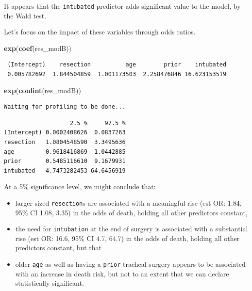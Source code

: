 \documentclass[]{book}
\newenvironment{Shaded}{\begin{snugshade}}{\end{snugshade}}
\newcommand{\KeywordTok}[1]{\textcolor[rgb]{0.13,0.29,0.53}{\textbf{#1}}}
\newcommand{\NormalTok}[1]{#1}
\providecommand{\tightlist}{%
  \setlength{\itemsep}{0pt}\setlength{\parskip}{0pt}}
\theoremstyle{definition}
\theoremstyle{definition}
\theoremstyle{definition}
\theoremstyle{remark}
\begin{document}
It appears that the \texttt{intubated} predictor adds significant value
to the model, by the Wald test.

Let's focus on the impact of these variables through odds ratios.

\begin{Shaded}
\begin{Highlighting}[]
\KeywordTok{exp}\NormalTok{(}\KeywordTok{coef}\NormalTok{(res_modB))}
\end{Highlighting}
\end{Shaded}

\begin{verbatim}
 (Intercept)    resection          age        prior    intubated 
 0.005782692  1.844504859  1.001173503  2.258476846 16.623153519 
\end{verbatim}

\begin{Shaded}
\begin{Highlighting}[]
\KeywordTok{exp}\NormalTok{(}\KeywordTok{confint}\NormalTok{(res_modB))}
\end{Highlighting}
\end{Shaded}

\begin{verbatim}
Waiting for profiling to be done...
\end{verbatim}

\begin{verbatim}
                   2.5 %     97.5 %
(Intercept) 0.0002408626  0.0837263
resection   1.0804548590  3.3495636
age         0.9618416869  1.0442885
prior       0.5485116610  9.1679931
intubated   4.7473282453 64.6456919
\end{verbatim}

At a 5\% significance level, we might conclude that:

\begin{itemize}
\tightlist
\item
  larger sized \texttt{resection}s are associated with a meaningful rise
  (est OR: 1.84, 95\% CI 1.08, 3.35) in the odds of death, holding all
  other predictors constant,
\item
  the need for \texttt{intubation} at the end of surgery is associated
  with a substantial rise (est OR: 16.6, 95\% CI 4.7, 64.7) in the odds
  of death, holding all other predictors constant, but that
\item
  older \texttt{age} as well as having a \texttt{prior} tracheal surgery
  appears to be associated with an increase in death risk, but not to an
  extent that we can declare statistically significant.
\end{itemize}
\end{document}
